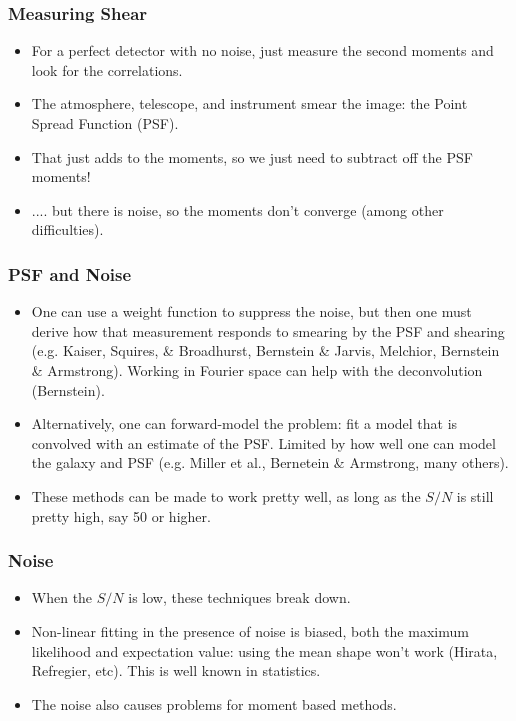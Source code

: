 \documentclass{beamer}
\begin{document}
\frame
{
    \frametitle{Measuring Shear}

    \begin{itemize}
        \item For a perfect detector with no noise, just measure
            the second moments and look for the correlations.
        \item The atmosphere, telescope, and instrument smear
            the image: the Point Spread Function (PSF).
        \item That just adds to the moments, so we just need to
            subtract off the PSF moments!
        \item .... but there is noise, so the moments don't converge (among
            other difficulties).
    \end{itemize}
}

\frame
{
    \frametitle{PSF and Noise}
    
    \begin{itemize}

        \item One can use a weight function to suppress the noise, but then one
            must derive how that measurement responds to smearing by the PSF
            and shearing (e.g. Kaiser, Squires, \& Broadhurst, Bernstein \& Jarvis, Melchior,
                    Bernstein \& Armstrong).  Working in Fourier space can help
            with the deconvolution (Bernstein).

        \item Alternatively, one can forward-model the problem: fit a model that is
            convolved with an estimate of the PSF.  Limited by how well one can
            model the galaxy and PSF (e.g. Miller et al., Bernetein \& Armstrong, many
            others).

        \item These methods can be made to work pretty well, as long as
            the $S/N$ is still pretty high, say 50 or higher.

    \end{itemize}
}

\frame
{
    \frametitle{Noise}

    \begin{itemize}
        \item When the $S/N$ is low, these techniques break down.
        \item Non-linear fitting in the presence of noise is biased, both
            the maximum likelihood and expectation value: using the mean
            shape won't work (Hirata, Refregier, etc).  This is well 
            known in statistics. 
        \item The noise also causes problems for moment based methods.
    \end{itemize}
}
\end{document}
